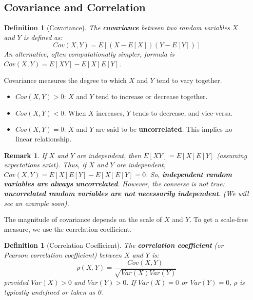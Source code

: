 \documentclass[11pt]{article}
\newtheorem{definition}[theorem]{Definition}
\newtheorem{remark}[theorem]{Remark}
\begin{document}
\subsection{Covariance and Correlation}
\begin{definition}[Covariance]
The \textbf{covariance} between two random variables $X$ and $Y$ is defined as:
\begin{equation}
Cov(X,Y) = E[(X-E[X])(Y-E[Y])]
\end{equation}
An alternative, often computationally simpler, formula is $Cov(X,Y) = E[XY] - E[X]E[Y]$.
\end{definition}
Covariance measures the degree to which $X$ and $Y$ tend to vary together.
\begin{itemize}
    \item $Cov(X,Y) > 0$: $X$ and $Y$ tend to increase or decrease together.
    \item $Cov(X,Y) < 0$: When $X$ increases, $Y$ tends to decrease, and vice-versa.
    \item $Cov(X,Y) = 0$: $X$ and $Y$ are said to be \textbf{uncorrelated}. This implies no linear relationship.
\end{itemize}

\begin{remark}
If $X$ and $Y$ are independent, then $E[XY] = E[X]E[Y]$ (assuming expectations exist).
Thus, if $X$ and $Y$ are independent, $Cov(X,Y) = E[X]E[Y] - E[X]E[Y] = 0$.
So, \textbf{independent random variables are always uncorrelated}.
However, the converse is not true: \textbf{uncorrelated random variables are not necessarily independent}. (We will see an example soon).
\end{remark}

The magnitude of covariance depends on the scale of $X$ and $Y$. To get a scale-free measure, we use the correlation coefficient.

\begin{definition}[Correlation Coefficient]
The \textbf{correlation coefficient} (or Pearson correlation coefficient) between $X$ and $Y$ is:
\begin{equation}
\rho(X,Y) = \frac{Cov(X,Y)}{\sqrt{Var(X)Var(Y)}}
\end{equation}
provided $Var(X) > 0$ and $Var(Y) > 0$.
If $Var(X)=0$ or $Var(Y)=0$, $\rho$ is typically undefined or taken as 0.
\end{definition}
\end{document}
